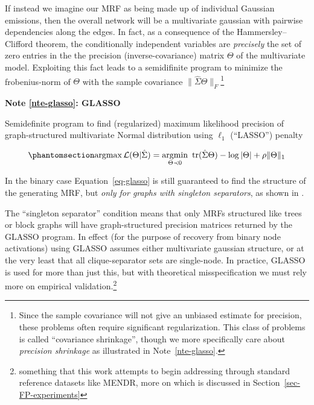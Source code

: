 \documentclass[%
	12pt,
		oneside,
		letterpaper
]{book}
\newcounter{quartocalloutnteno}
\newcommand{\quartocalloutnte}[1]{\refstepcounter{quartocalloutnteno}\label{#1}}
\begin{document}
If instead we imagine our MRF as being made up of individual Gaussian
emissions, then the overall network will be a multivariate gaussian with
pairwise dependencies along the edges. In fact, as a consequence of the
Hammersley--Clifford theorem, the conditionally independent variables
are \emph{precisely} the set of zero entries in the the precision
(inverse-covariance) matrix \(\Theta\) of the multivariate model.
Exploiting this fact leads to a semidifinite program to minimize the
frobenius-norm of \(\Theta\) with the sample covariance
\(\| \hat{\Sigma}\Theta \|_F\)\footnote{ Since the sample covariance
  will not give an unbiased estimate for precision, these problems often
  require significant regularization. This class of problems is called
  ``covariance shrinkage'', though we more specifically care about
  \emph{precision shrinkage} as illustrated in Note~\ref{nte-glasso}.}

\begin{tcolorbox}[enhanced jigsaw, opacityback=0, colframe=quarto-callout-note-color-frame, arc=.35mm, leftrule=.75mm, breakable, bottomrule=.15mm, left=2mm, colback=white, toprule=.15mm, rightrule=.15mm]

\quartocalloutnte{nte-glasso} 

\vspace{-3mm}\textbf{Note \ref*{nte-glasso}: GLASSO}\vspace{3mm}

Semidefinite program to find (regularized) maximum likelihood precision
of graph-structured multivariate Normal distribution using \(\ell_1\)
(``LASSO'') penalty \autocite{Sparseinversecovariance_Friedman2008}

\begin{equation}\phantomsection\label{eq-glasso}{
\operatorname*{argmax} \mathcal{L}(\Theta|\hat{\Sigma})
  = \operatorname*{argmin}_{\Theta \prec 0}\ \text{tr}(\hat{\Sigma} \Theta) - \log |\Theta|+ \rho\|\Theta\|_1
}\end{equation}

In the binary case Equation~\ref{eq-glasso} is still guaranteed to find
the structure of the generating MRF, but \emph{only for graphs with
singleton separators}, as shown in
\textcite{Structureestimationdiscrete_Loh2012}.

\end{tcolorbox}

The ``singleton separator'' condition means that only MRFs structured
like trees or block graphs will have graph-structured precision matrices
returned by the GLASSO program. In effect (for the purpose of recovery
from binary node activations) using GLASSO assumes either multivariate
gaussian structure, or at the very least that all clique-separator sets
are single-node. In practice, GLASSO is used for more than just this,
but with theoretical misspecification we must rely more on empirical
validation.\footnote{ something that this work attempts to begin
  addressing through standard reference datasets like MENDR, more on
  which is discussed in Section~\ref{sec-FP-experiments}}
\end{document}
